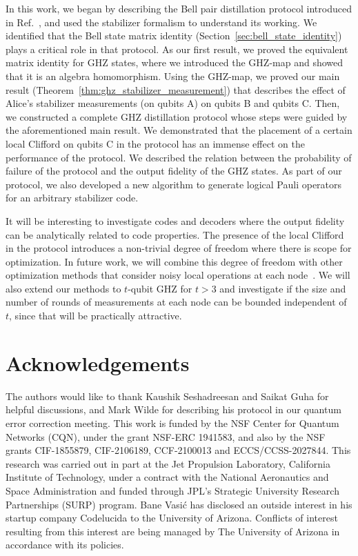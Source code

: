 \documentclass[journal,onecolumn]{IEEEtran}
\begin{document}
In this work, we began by describing the Bell pair distillation protocol introduced in Ref.~\cite{Wilde-isit10}, and used the stabilizer formalism to understand its working.
We identified that the Bell state matrix identity (Section~\ref{sec:bell_state_identity}) plays a critical role in that protocol.
As our first result, we proved the equivalent matrix identity for GHZ states, where we introduced the GHZ-map and showed that it is an algebra homomorphism.
Using the GHZ-map, we proved our main result (Theorem~\ref{thm:ghz_stabilizer_measurement}) that describes the effect of Alice's stabilizer measurements (on qubits A) on qubits B and qubits C.
Then, we constructed a complete GHZ distillation protocol whose steps were guided by the aforementioned main result.
We demonstrated that the placement of a certain local Clifford on qubits C in the protocol has an immense effect on the performance of the protocol.
We described the relation between the probability of failure of the protocol and the output fidelity of the GHZ states.
As part of our protocol, we also developed a new algorithm to generate logical Pauli operators for an arbitrary stabilizer code.

It will be interesting to investigate codes and decoders where the output fidelity can be analytically related to code properties.
The presence of the local Clifford in the protocol introduces a non-trivial degree of freedom where there is scope for optimization.
In future work, we will combine this degree of freedom with other optimization methods that consider noisy local operations at each node~\cite{Krastanov-quantum19}.
We will also extend our methods to $t$-qubit GHZ for $t > 3$ and investigate if the size and number of rounds of measurements at each node can be bounded independent of $t$, since that will be practically attractive.



\section*{Acknowledgements}

The authors would like to thank Kaushik Seshadreesan and Saikat Guha for helpful discussions, and Mark Wilde for describing his protocol in our quantum error correction meeting.
This work is funded by the NSF Center for Quantum Networks (CQN), under the grant NSF-ERC 1941583, and also by the NSF grants CIF-1855879, CIF-2106189,
CCF-2100013 and ECCS/CCSS-2027844. 
This research was carried out in part at the Jet Propulsion Laboratory, California Institute of Technology, under a contract with the National Aeronautics and Space Administration and funded through JPL’s Strategic University Research Partnerships (SURP) program.
Bane Vasi\'c has disclosed an outside interest in his startup company Codelucida to the University of Arizona.  
Conflicts of interest resulting from this interest are being managed by The University of Arizona in accordance with its policies.
\end{document}

